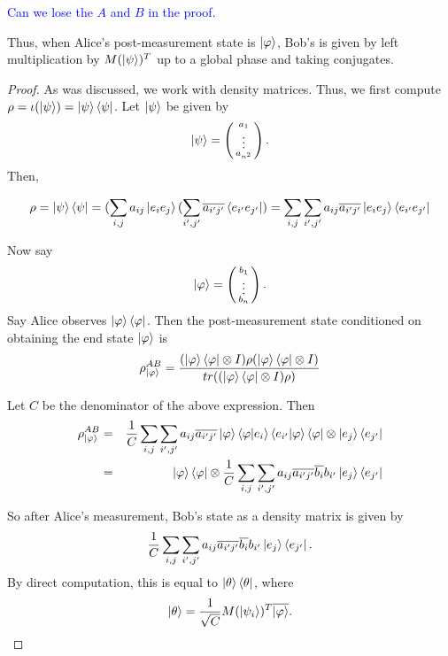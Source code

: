 \textcolor{blue}{Can we lose the $A$ and $B$ in the proof.}

Thus, when Alice's post-measurement state is $\ket{\varphi}$, Bob's is given by left multiplication by $M(\ket{\psi})^T$ up to a global phase and taking conjugates.

\begin{proof}
As was discussed, we work with density matrices.  Thus, we first compute $\rho=\iota(\ket{\psi})=\ket{\psi}\bra{\psi}$.  Let $\ket{\psi}$ be given by 
\begin{equation}
\ket{\psi}=\left(\begin{smallmatrix}a_1\\ \vdots \\a_{n^2}\end{smallmatrix}\right).
\end{equation}
Then, 

\begin{equation}
\rho=\ket{\psi}\bra{\psi}=(\sum_{i,j} a_{ij}\ket{e_i e_j}(\sum_{i',j'} \overline{a_{i'j'}}\bra{e_{i'} e_{j'}})=\sum_{i,j} \sum_{i',j'} a_{ij} \overline{a_{i'j'}}\ket{e_i e_j}\bra{e_{i'} e_{j'}}   
\end{equation}

Now say
\begin{equation}
\ket{\varphi}=\left(\begin{smallmatrix}b_1\\ \vdots \\b_n\end{smallmatrix}\right).
\end{equation}
Say Alice observes $\ket{\varphi}\bra{\varphi}$.
Then the post-measurement state conditioned on obtaining the end state $\ket{\varphi}$ is
\begin{equation}
\rho_{\ket{\varphi}}^{AB}=\frac{(\ket{\varphi}\bra{\varphi} \otimes I)\rho(\ket{\varphi}\bra{\varphi} \otimes I)}{tr((\ket{\varphi}\bra{\varphi} \otimes I)\rho)}
\end{equation}

Let $C$ be the denominator of the above expression. Then 
\begin{eqnarray}
\rho_{\ket{\varphi}}^{AB}&=&\frac{1}{C} \sum_{i,j} \sum_{{i'}, {j'}} a_{ij} \overline{a_{i'j'}}\ket{\varphi}\braket{\varphi|e_i}\braket{e_{i'}|\varphi}\bra{\varphi} \otimes \ket{e_j}\bra{e_{j'}}\\
&=&\ket{\varphi}\bra{\varphi} \otimes \frac{1}{C} \sum_{i,j} \sum_{{i'}, {j'}} a_{ij} \overline{a_{i'j'}}\overline{b_i}b_{i'}\ket{e_j}\bra{e_{j'}}
\end{eqnarray}

So after Alice's measurement, Bob's state as a density matrix is given by
\begin{equation}
    \frac{1}{C} \sum_{i,j} \sum_{{i'}, {j'}} a_{ij} \overline{a_{i'j'}}\overline{b_i}b_{i'}\ket{e_j}\bra{e_{j'}}.
\end{equation}
By direct computation, this is equal to $\ket{\theta}\bra{\theta}$, where
\begin{equation}
    \ket{\theta}=\frac{1}{\sqrt{C}} M(\ket{\psi_i})^T \overline{\ket{\varphi}}.
\end{equation}


\end{proof}
